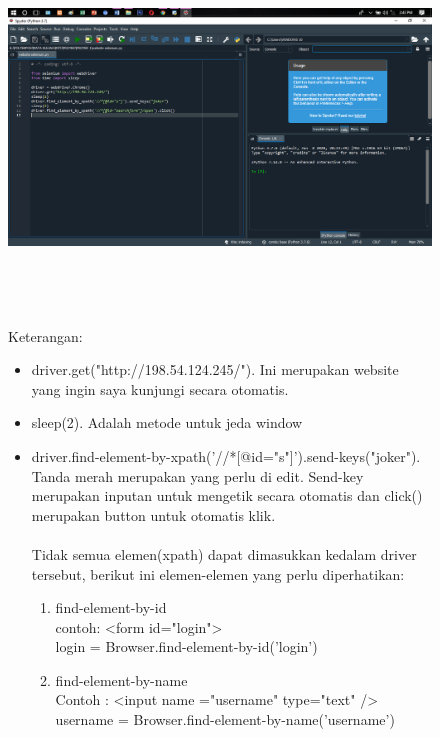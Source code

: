 \documentclass{book}
\begin{document}
\begin{enumerate}
\begin{figure}
    \centerline{\includegraphics [width=15.17cm, height=8.53cm]{figures/4.2.png}}\\
    Keterangan:\\
    \renewcommand{\labelitemi}{$\textendash$}
    \begin{itemize}
    \item driver.get("http://198.54.124.245/"). Ini merupakan website yang ingin saya kunjungi secara otomatis.
    \item sleep(2). Adalah metode untuk jeda window
    \item driver.find-element-by-xpath('//*[@id="s"]').send-keys("joker"). Tanda merah merupakan yang perlu di edit. Send-key merupakan inputan untuk mengetik secara otomatis dan click() merupakan button untuk otomatis klik.
\newpage
    \paragraph{} Tidak semua elemen(xpath) dapat dimasukkan kedalam driver tersebut, berikut ini elemen-elemen yang perlu diperhatikan:
        \begin{enumerate}
 
        \item find-element-by-id\\
        contoh: <form id="login">\\
        login = Browser.find-element-by-id('login')
       
        \item find-element-by-name\\
        Contoh : <input name ="username" type="text" />\\
        username = Browser.find-element-by-name('username')


\end{enumerate}
\end{itemize}
\end{figure}
\end{enumerate}
\end{document}
